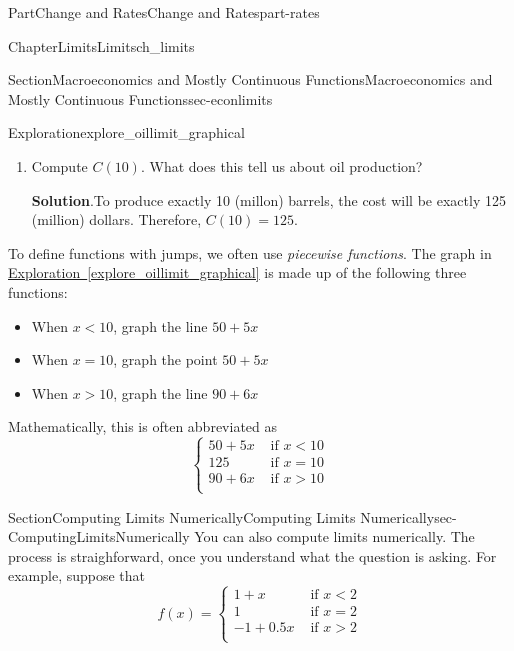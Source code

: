 \documentclass{tufte-book}
\newcommand{\blocktitlefont}{\relax}
\newcommand{\xreffont}{\relax}
\numberwithin{equation}{chapter}
\newcommand{\lt}{<}
\newcommand{\gt}{>}
\begin{document}
\begin{partptx}{Part}{Change and Rates}{}{Change and Rates}{}{}{part-rates}
\begin{chapterptx}{Chapter}{Limits}{}{Limits}{}{}{ch_limits}
\begin{sectionptx}{Section}{Macroeconomics and Mostly Continuous Functions}{}{Macroeconomics and Mostly Continuous Functions}{}{}{sec-econlimits}
\begin{exploration}{Exploration}{}{explore_oillimit_graphical}
\begin{enumerate}[font=\bfseries,label=(\alph*),ref=\alph*]
\item{}Compute \(C(10).\) What does this tell us about oil production?%
\par\smallskip%
\noindent\textbf{\blocktitlefont Solution}.\hypertarget{explore_oillimit_graphical-4-2}{}\quad{}To produce exactly 10 (millon) barrels, the cost will be exactly \textdollar{}125 (million) dollars. Therefore,   \(C(10)= 125.\)%
\end{enumerate}%
\end{exploration}%
To define functions with jumps, we often use \emph{piecewise functions}. The graph in \hyperref[explore_oillimit_graphical]{Exploration~{\xreffont\ref{explore_oillimit_graphical}}} is made up of the following three functions:%
\begin{itemize}[label=\textbullet]
\item{}When \(x\lt 10\), graph the line \(50 + 5x\)%
\item{}When \(x = 10\), graph the point \(50 + 5x\)%
\item{}When \(x\gt 10\), graph the line \(90 + 6x\)%
\end{itemize}
Mathematically, this is often abbreviated as%
\begin{equation*}
\begin{cases}
50 + 5x & \text{ if } x\lt 10 \\ 
125     & \text{ if } x = 10 \\ 
90 + 6x & \text{ if } x\gt 10 \\ 
\end{cases}
\end{equation*}
%
\end{sectionptx}
%
%
\typeout{************************************************}
\typeout{************************************************}
%
\begin{sectionptx}{Section}{Computing Limits Numerically}{}{Computing Limits Numerically}{}{}{sec-ComputingLimitsNumerically}
You can also compute limits numerically. The process is straighforward, once you understand what the question is asking. For example, suppose that%
\begin{equation*}
f(x) = 
\begin{cases}
1 + x   & \text{ if } x \lt 2 \\   
1       & \text{ if } x = 2 \\   
-1+0.5x & \text{ if } x \gt 2 \\   
\end{cases}
\end{equation*}

\end{sectionptx}
\end{chapterptx}
\end{partptx}
\end{document}
